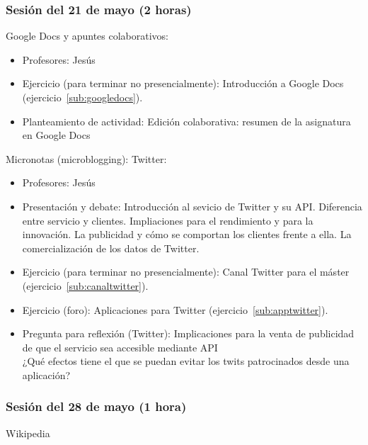 \documentclass[a4paper,12pt]{article}
\begin{document}
\subsubsection{Sesión del 21 de mayo (2 horas)}

Google Docs y apuntes colaborativos:

\begin{itemize}
\item Profesores: Jesús
\item Ejercicio (para terminar no presencialmente): Introducción a Google Docs (ejercicio~\ref{sub:googledocs}).
\item Planteamiento de actividad: Edición colaborativa: resumen de la asignatura en Google Docs
\end{itemize}

Micronotas (microblogging): Twitter:

\begin{itemize}
\item Profesores: Jesús
\item Presentación y debate: Introducción al sevicio de Twitter y su API. Diferencia entre servicio y clientes. Impliaciones para el rendimiento y para la innovación. La publicidad y cómo se comportan los clientes frente a ella. La comercialización de los datos de Twitter.
\item Ejercicio (para terminar no presencialmente): Canal Twitter para el máster (ejercicio~\ref{sub:canaltwitter}).
\item Ejercicio (foro): Aplicaciones para Twitter (ejercicio~\ref{sub:apptwitter}).
\item Pregunta para reflexión (Twitter): Implicaciones para la venta de publicidad de que el servicio sea accesible mediante API \\
  ¿Qué efectos tiene el que se puedan evitar los twits patrocinados desde una aplicación?
\end{itemize}

\subsubsection{Sesión del 28 de mayo (1 hora)}


Wikipedia
\end{document}
